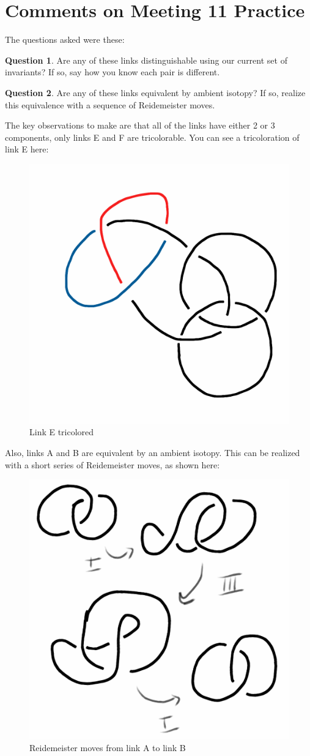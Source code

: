 \documentclass[12pt,letterpaper]{article}
\theoremstyle{definition}
\newtheorem{question}{Question}
\begin{document}
\setlength{\parskip}{1ex plus 0.5ex minus 0.2ex}
\setlength{\parindent}{0pt}

\pagestyle{fancy}
\cfoot{}


\section*{Comments on Meeting 11 Practice}


The questions asked were these:

\begin{question} 
Are any of these links distinguishable using our current set of invariants?
If so, say how you know each pair is different.
\end{question}


\begin{question} 
Are any of these links equivalent by ambient isotopy? 
If so, realize this equivalence with a sequence of Reidemeister moves.
\end{question}

The key observations to make are that all of the links have either 2 or 3 components, only links E and F are tricolorable. You can see a tricoloration of link E here:


\begin{figure}[h]
    \centering
        \includegraphics[width=.3\textwidth]{meeting11pics/borromean-trefoil-tricolor.png}
        \caption{Link E tricolored}
\end{figure}

Also, links A and B are equivalent by an ambient isotopy. This can be realized with a short series of Reidemeister moves, as shown here:

\begin{figure}[h]
    \centering
        \includegraphics[width=.4\textwidth]{meeting11pics/hopf-rm-mirror.png}
        \caption{Reidemeister moves from link A to link B}
\end{figure}
\end{document}
